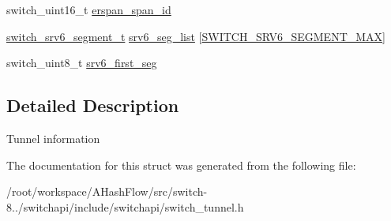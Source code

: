 \begin{DoxyCompactItemize}
\item 
switch\+\_\+uint16\+\_\+t \hyperlink{group__Tunnel_gad06fec7740f72b2510bb540c7744792e}{erspan\+\_\+span\+\_\+id}
\item 
\hyperlink{group__Tunnel_ga58531f8a8bab6f7c34f9bd77c243ec2f}{switch\+\_\+srv6\+\_\+segment\+\_\+t} \hyperlink{group__Tunnel_ga14d1a11fe2372fe426867817ab8ddabc}{srv6\+\_\+seg\+\_\+list} \mbox{[}\hyperlink{group__Tunnel_ga7da56385741dd85fc62b0518245e0b06}{S\+W\+I\+T\+C\+H\+\_\+\+S\+R\+V6\+\_\+\+S\+E\+G\+M\+E\+N\+T\+\_\+\+M\+A\+X}\mbox{]}
\item 
switch\+\_\+uint8\+\_\+t \hyperlink{group__Tunnel_gaf87c6fecf6dff3564910928b7e8eea7a}{srv6\+\_\+first\+\_\+seg}
\end{DoxyCompactItemize}


\subsection{Detailed Description}
Tunnel information 

The documentation for this struct was generated from the following file\+:\begin{DoxyCompactItemize}
\item 
/root/workspace/\+A\+Hash\+Flow/src/switch-\/8../switchapi/include/switchapi/switch\+\_\+tunnel.\+h\end{DoxyCompactItemize}
